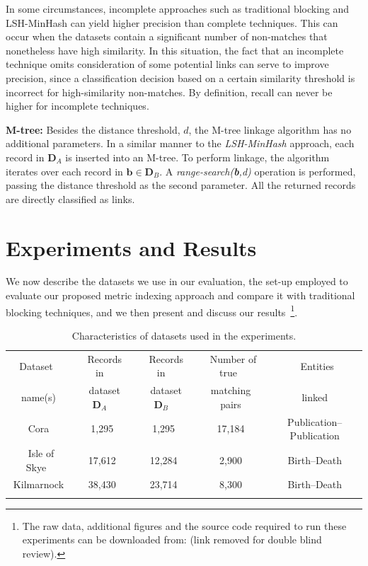 \documentclass{llncs}
\begin{document}
In some circumstances, incomplete approaches such as traditional
blocking and LSH-MinHash can yield higher precision than complete
techniques. This can occur when the datasets contain a significant
number of non-matches that nonetheless have high similarity. In this
situation, the fact that an incomplete technique omits consideration
of some potential links can serve to improve precision, since a
classification decision based on a certain similarity threshold is
incorrect for high-similarity non-matches. By definition, recall can
never be higher for incomplete techniques.

\textbf{M-tree:} Besides the distance threshold, $d$, the M-tree
linkage algorithm has no additional parameters. In a similar manner
to the \emph{LSH-MinHash} approach, each record in $\mathbf{D}_A$ is inserted into an M-tree. To perform linkage, the algorithm iterates
over each record in $\mathbf{b} \in \mathbf{D}_B$. A
\emph{range-search(\textbf{b},d)} operation is performed, passing the
distance threshold as the second parameter. All the returned records
are directly classified as links.


\section{Experiments and Results}
\label{sec-exp}

We now describe the datasets we use in our evaluation, the set-up
employed to evaluate our proposed metric indexing approach and compare
it with traditional blocking techniques, and we then present and discuss
our results~\footnote{The raw data, additional figures and the source
code required to run these experiments can be downloaded from:
(link removed for double blind review).}.


\begin{table}[t]
\caption{Characteristics of datasets used in the experiments.}
 \label{table-datasets}
  \centering
  \begin{scriptsize}
  \begin{tabular}{ccccc}
  \hline\noalign{\smallskip}
  Dataset~ & ~Records in~& ~Records in~ & ~Number of true~& ~Entities \\
    name(s)  & ~dataset $\mathbf{D}_A$~ & ~dataset $\mathbf{D}_B$~ &
    matching pairs & linked \\
  \noalign{\smallskip} \hline \noalign{\smallskip}
  Cora & 1,295 & 1,295 & 17,184 & Publication--Publication\\
  ~Isle of Skye~ & 17,612 & 12,284& 2,900 & Birth--Death \\
  Kilmarnock & ~38,430~ & ~23,714~ & ~8,300~ & ~Birth--Death~ \\
  \noalign{\smallskip} \hline
  \end{tabular}
  \end{scriptsize}
\end{table}
\end{document}
